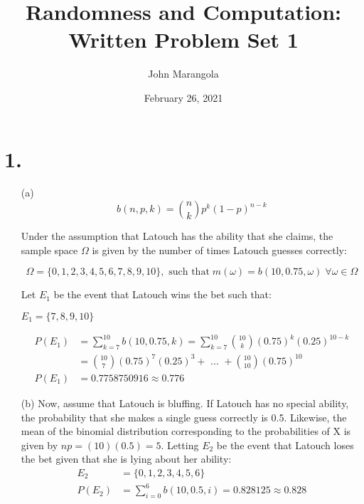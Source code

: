 \documentclass[12pt]{article}
\title{Randomness and Computation: Written Problem Set 1}
\author{John Marangola}
\date{February 26, 2021}
\begin{document}
\maketitle

\newcommand{\ec}{\frac{1}{4\pi\epsilon_0}}
\newcommand{\qa}{\frac{q^2}{a^2}}
\newcommand{\ih}{\hat{i}}
\newcommand{\jh}{\hat{j}}
\newcommand{\kh}{\hat{k}}
\newcommand{\at}[2][]{#1|_{#2}}
\section*{1.}
    \begin{enumerate}
        \item[(a)]
        \begin{equation}
            b(n, p, k) = \binom{n}{k}p^{k}\left(1-p\right)^{n-k}
        \end{equation}
        \begin{flushleft}
        
            Under the assumption that Latouch has the ability that she claims, the sample space $\Omega$ is given by the number of times Latouch guesses correctly:
        \end{flushleft}
        \begin{equation*}
            \Omega = \{0, 1, 2, 3, 4, 5, 6, 7, 8, 9, 10\}, \text{ such that} \; m(\omega)=b(10, 0.75, \omega) \; \forall \omega\in\Omega 
        \end{equation*}
        \begin{flushleft}
            Let $E_1$ be the event that Latouch wins the bet such that:
        \end{flushleft}
        \begin{center}
            $E_1 = \{7, 8, 9, 10\}$
        \end{center}
        \begin{align*}
            P(E_1) &= \sum_{k=7}^{10}{b(10, 0.75, k)} = \sum_{k=7}^{10}{\binom{10}{k}(0.75)^{k}\left(0.25\right)^{10-k}} \\
            &= \binom{10}{7}(0.75)^7 (0.25)^3 +\text{ ... } + \binom{10}{10}(0.75)^{10} \\
            P(E_1) &= 0.7758750916 \approx 0.776
        \end{align*}
        \item[(b)] Now, assume that Latouch is bluffing. If Latouch has no special ability, the probability that she makes a single guess correctly is 0.5. Likewise, the mean of the binomial distribution corresponding to the probabilities of X is given by $np=(10)(0.5)=5$. Letting $E_2$ be the event that Latouch loses the bet given that she is lying about her ability:
        \begin{align*}
            E_2 &= \{0, 1, 2, 3, 4, 5, 6\} \\
            P(E_2) &= \sum_{i=0}^6 b(10, 0.5, i) =0.828125\approx 0.828
        \end{align*}
    \end{enumerate}
\end{document}
